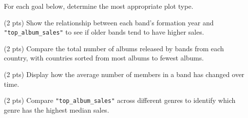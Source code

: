 \documentclass[twoside,12pt]{article}
\begin{document}
\begin{probset}
\begin{prob}[(10 pts)]
\begin{subprobset}
\begin{subprob}
\smallskip
{}

\small
{}


\smallskip
{}

\smallskip
{}

\smallskip
{}

\end{subprob}
\end{subprobset}
\end{prob}

\newpage

\begin{prob}[(10 pts)]

For each goal below, determine the most appropriate plot type.

\begin{subprobset}

\begin{subprob}(2 pts)
Show the relationship between each band's formation year and \texttt{"top\_album\_sales"} to see if older bands tend to have higher sales.

\smallskip
{}  

\end{subprob}
\begin{subprob}(2 pts)
Compare the total number of albums released by bands from each country, with countries sorted from most albums to fewest albums.

\smallskip
{}  

\end{subprob}
\begin{subprob}(2 pts)
Display how the average number of members in a band has changed over time.

\smallskip
{}  
\end{subprob}
\begin{subprob}(2 pts)
Compare \texttt{"top\_album\_sales"} across different genres to identify which genre has the highest median sales.


\end{subprob}
\end{subprobset}
\end{prob}
\end{probset}
\end{document}
